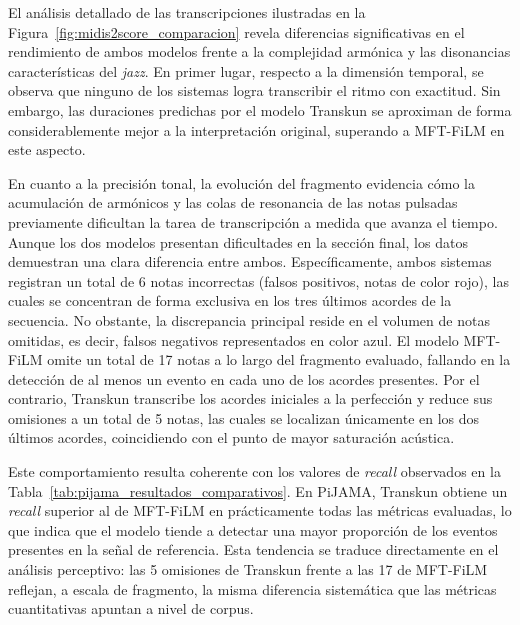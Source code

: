 \documentclass[11pt,spanish,listoffigures,listoftables]{tfgetsinf}
\begin{document}
El análisis detallado de las transcripciones ilustradas en la Figura~\ref{fig:midis2score_comparacion} revela diferencias significativas en
el rendimiento de ambos modelos frente a la complejidad armónica y las disonancias características del \textit{jazz}. En primer lugar,
respecto a la dimensión temporal, se observa que ninguno de los sistemas logra transcribir el ritmo con exactitud. Sin embargo,
las duraciones predichas por el modelo Transkun se aproximan de forma considerablemente mejor a la interpretación original, superando a
MFT-FiLM en este aspecto.

En cuanto a la precisión tonal, la evolución del fragmento evidencia cómo la acumulación de armónicos y las colas de resonancia de las notas
pulsadas previamente dificultan la tarea de transcripción a medida que avanza el tiempo. Aunque los dos modelos presentan dificultades en
la sección final, los datos demuestran una clara diferencia entre ambos. Específicamente, ambos sistemas
registran un total de 6 notas incorrectas (falsos positivos, notas de color rojo), las cuales se concentran de forma exclusiva en los tres últimos acordes de la secuencia. No obstante, la
discrepancia principal reside en el volumen de notas omitidas, es decir, falsos negativos representados en color azul. El modelo MFT-FiLM omite un total de 17 notas a lo largo del fragmento evaluado,
fallando en la detección de al menos un evento en
cada uno de los acordes presentes. Por el contrario, Transkun transcribe los acordes iniciales a la perfección y reduce sus omisiones a
un total de 5 notas, las cuales se localizan únicamente en los dos últimos acordes, coincidiendo con el punto de mayor saturación acústica.

Este comportamiento resulta coherente con los valores de \textit{recall} observados en la Tabla~\ref{tab:pijama_resultados_comparativos}.
En PiJAMA, Transkun obtiene un \textit{recall} superior al de MFT-FiLM en prácticamente todas las métricas evaluadas, lo que indica que el
modelo tiende a detectar una mayor proporción de los eventos presentes en la señal de referencia. Esta tendencia se traduce directamente en el
análisis perceptivo: las 5 omisiones de Transkun frente a las 17 de MFT-FiLM reflejan, a escala de fragmento, la misma diferencia sistemática
que las métricas cuantitativas apuntan a nivel de corpus.
\end{document}
